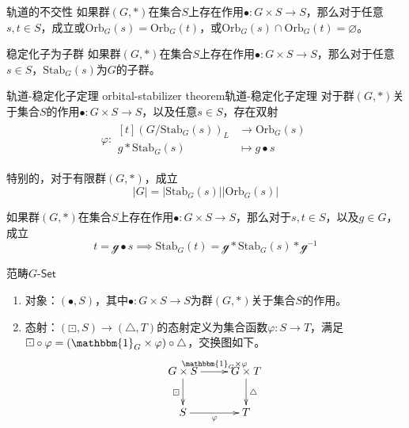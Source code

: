 \begin{proposition}{轨道的不交性}
	如果群$(G,*)$在集合$S$上存在作用$\bullet:G\times S\to S$，那么对于任意$s,t\in S$，成立或$\mathrm{Orb}_G(s)=\mathrm{Orb}_G(t)$，或$\mathrm{Orb}_G(s)\cap \mathrm{Orb}_G(t)=\varnothing$。
\end{proposition}

\begin{proposition}{稳定化子为子群}
	如果群$(G,*)$在集合$S$上存在作用$\bullet:G\times S\to S$，那么对于任意$s\in S$，$\mathrm{Stab}_G(s)$为$G$的子群。
\end{proposition}

\begin{theorem}{轨道-稳定化子定理 orbital-stabilizer theorem}{轨道-稳定化子定理}
	对于群$(G,*)$关于集合$S$的作用$\bullet:G\times S\to S$，以及任意$s\in S$，存在双射
	\begin{align*}
		\varphi:\begin{aligned}[t]
			(G/\mathrm{Stab}_G(s))_L&\longrightarrow\mathrm{Orb}_G(s)\\
			g*\mathrm{Stab}_G(s)&\longmapsto g\bullet s
		\end{aligned}
	\end{align*}
	
	特别的，对于有限群$(G,*)$，成立
	$$
	|G|=|\mathrm{Stab}_G(s)||\mathrm{Orb}_G(s)|
	$$
\end{theorem}

\begin{proposition}
	如果群$(G,*)$在集合$S$上存在作用$\bullet:G\times S\to S$，那么对于$s,t\in S$，以及$g\in G$，成立
	$$
	t=\mathcal{g}\bullet s\implies \mathrm{Stab}_G(t)=\mathcal{g}*\mathrm{Stab}_G(s)*\mathcal{g}^{-1}
	$$
\end{proposition}

\begin{definition}{范畴$G$-$\mathsf{Set}$}
	\begin{enumerate}
		\item 对象：$(\bullet,S)$，其中$\bullet:G\times S\to S$为群$(G,*)$关于集合$S$的作用。
		\item 态射：$(\boxdot,S)\to (\triangle,T)$的态射定义为集合函数$\varphi:S\to T$，满足$\boxdot \circ \varphi=(\mathbbm{1}_G\times \varphi)\circ \triangle$，交换图如下。
		$$
		\xymatrix{
			G\times S \ar[r]^{\mathbbm{1}_G\times \varphi} \ar[d]_{\boxdot} & G\times T \ar[d]^{\triangle}\\
			S \ar[r]_{\varphi} & T
		}
		$$
	\end{enumerate}
\end{definition}

